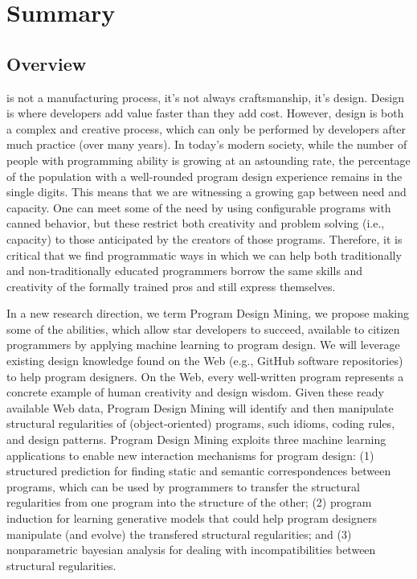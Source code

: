 \chapter{Summary}{}
\label{sec:intro}

\section*{Overview} %
\label{sec:overview}

 is not a manufacturing process, it's not 
always craftsmanship, it's design. Design is where developers add 
value faster than they add cost. However, design is both a complex 
and creative process, which can only be performed by developers after 
much practice (over many years). In today’s modern society, while the 
number of people with programming ability is growing at an astounding 
rate, the percentage of the population with a well-rounded program 
design experience remains in the single digits. This means that we are 
witnessing a growing gap between need and capacity. One can meet some of 
the need by using configurable programs with canned behavior, but these 
restrict both creativity and problem solving (i.e., capacity) to those 
anticipated by the creators of those programs. Therefore, it is critical 
that we find programmatic ways in which we can help both traditionally 
and non-traditionally educated programmers borrow the same skills and 
creativity of the formally trained pros and still express themselves.

In a new research direction, we term Program Design Mining, we propose  
making some of the abilities, which allow star developers to succeed, 
available to citizen programmers by applying machine learning to program 
design. We will leverage existing design knowledge found on the Web (e.g., 
GitHub software repositories) to help program designers. On the Web, 
every well-written program represents a concrete example of human 
creativity and design wisdom. Given these ready available Web data, 
Program Design Mining will identify and then manipulate structural 
regularities \cite{minsky1991law} of (object-oriented) programs, such idioms, 
coding rules, and design patterns. Program Design Mining exploits three machine 
learning applications to enable new interaction mechanisms for program 
design: (1) structured prediction \cite{collins2002discriminative} for 
finding static and semantic correspondences between programs, which can 
be used by programmers to transfer the structural regularities from one 
program into the structure of the other; (2) program induction \cite{lake2015human} 
for learning generative models that could help program designers manipulate 
(and evolve) the transfered structural regularities; and (3) nonparametric 
bayesian analysis \cite{allamanis2014mining} for dealing with incompatibilities 
between structural regularities.

